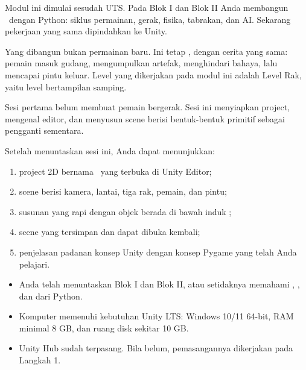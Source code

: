 

Modul ini dimulai sesudah UTS. Pada Blok I dan Blok II Anda membangun
\NamaPermainan\ dengan Python: siklus permainan, gerak, fisika, tabrakan, dan
AI. Sekarang pekerjaan yang sama dipindahkan ke  Unity.

Yang dibangun bukan permainan baru. Ini tetap \NamaPermainan, dengan cerita
yang sama: pemain masuk gudang, mengumpulkan artefak, menghindari bahaya,
lalu mencapai pintu keluar. Level yang dikerjakan pada modul ini adalah Level
Rak, yaitu level bertampilan samping.

Sesi pertama belum membuat pemain bergerak. Sesi ini menyiapkan project,
mengenal editor, dan menyusun scene berisi bentuk-bentuk primitif sebagai
pengganti sementara.


\begin{tujuanbox}
Setelah menuntaskan sesi ini, Anda dapat menunjukkan:
\begin{enumerate}[leftmargin=1.5em, itemsep=0.2em]
  \item project 2D bernama \NamaProject\ yang terbuka di Unity Editor;
  \item scene  berisi kamera, lantai, tiga rak, pemain, dan
        pintu;
  \item susunan  yang rapi dengan objek berada di bawah
        induk ;
  \item scene yang tersimpan dan dapat dibuka kembali;
  \item penjelasan padanan konsep Unity dengan konsep Pygame yang telah Anda
        pelajari.
\end{enumerate}
\end{tujuanbox}


\begin{prasyaratbox}
\begin{itemize}[leftmargin=1.4em, itemsep=0.25em]
  \item Anda telah menuntaskan Blok I dan Blok II, atau setidaknya memahami
        , , dan 
        dari Python.
  \item Komputer memenuhi kebutuhan Unity LTS: Windows 10/11 64-bit,
        RAM minimal 8 GB, dan ruang disk sekitar 10 GB.
  \item Unity Hub sudah terpasang. Bila belum, pemasangannya dikerjakan pada
        Langkah 1.
\end{itemize}
\end{prasyaratbox}

